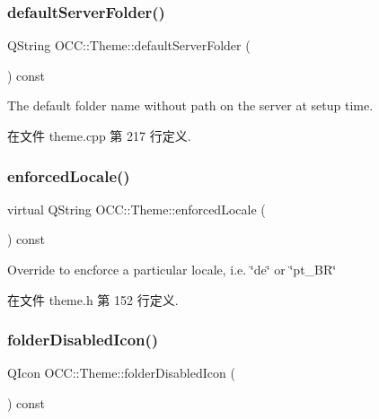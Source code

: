 \subsubsection{\texorpdfstring{default\+Server\+Folder()}{defaultServerFolder()}}
{\footnotesize\ttfamily Q\+String O\+C\+C\+::\+Theme\+::default\+Server\+Folder (\begin{DoxyParamCaption}{ }\end{DoxyParamCaption}) const\hspace{0.3cm}{\ttfamily [virtual]}}

The default folder name without path on the server at setup time. 

在文件 theme.\+cpp 第 217 行定义.

\mbox{\label{class_o_c_c_1_1_theme_a87734666c55e9796b0f4335983b0ade5}} 
\subsubsection{\texorpdfstring{enforced\+Locale()}{enforcedLocale()}}
{\footnotesize\ttfamily virtual Q\+String O\+C\+C\+::\+Theme\+::enforced\+Locale (\begin{DoxyParamCaption}{ }\end{DoxyParamCaption}) const\hspace{0.3cm}{\ttfamily [virtual]}}

Override to encforce a particular locale, i.\+e. \char`\"{}de\char`\"{} or \char`\"{}pt\+\_\+\+B\+R\char`\"{} 

在文件 theme.\+h 第 152 行定义.

\mbox{\label{class_o_c_c_1_1_theme_a540552aeb95babaa8baa41facbfac31c}} 
\subsubsection{\texorpdfstring{folder\+Disabled\+Icon()}{folderDisabledIcon()}}
{\footnotesize\ttfamily Q\+Icon O\+C\+C\+::\+Theme\+::folder\+Disabled\+Icon (\begin{DoxyParamCaption}{ }\end{DoxyParamCaption}) const\hspace{0.3cm}{\ttfamily [virtual]}}



